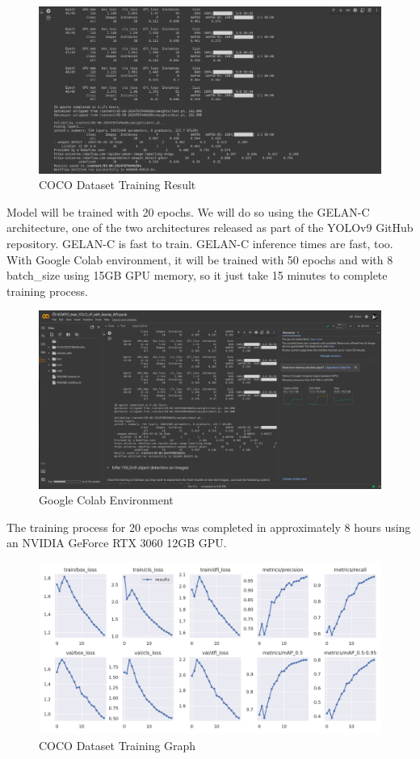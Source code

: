             \begin{figure}[H]
                \centering
                \includegraphics[width=0.8\linewidth]{img/train_result.png}
                \caption{COCO Dataset Training Result}
                \label{fig:train-result}
            \end{figure}
            Model will be trained with 20 epochs. We will do so using the GELAN-C architecture, one of the two architectures released as part of the YOLOv9 GitHub repository. GELAN-C is fast to train. GELAN-C inference times are fast, too. \\
            \vspace{3mm}
            With Google Colab environment, it will be trained with 50 epochs and with 8 batch\_size using 15GB GPU memory, so it just take 15 minutes to complete training process. 
            \begin{figure}[H]
                \centering
                \includegraphics[width=0.8\linewidth]{img/colab_env.png}
                \caption{Google Colab Environment}
                \label{fig:colab-env}
            \end{figure}
            The training process for 20 epochs was completed in approximately 8 hours using an NVIDIA GeForce RTX 3060 12GB GPU. \\
            \vspace{3mm}
            \begin{figure}[H]
                \centering
                \includegraphics[width=0.8\linewidth]{img/results.png}
                \caption{COCO Dataset Training Graph}
                \label{fig:graph-result}
            \end{figure}
